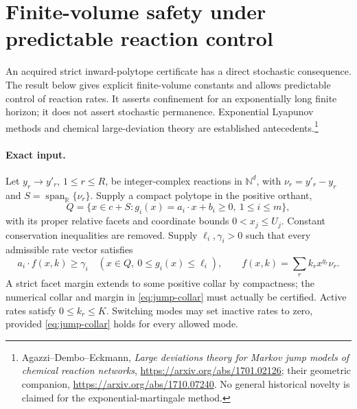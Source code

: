 \section{Finite-volume safety under predictable reaction control}
\label{app:jump-safety}

An acquired strict inward-polytope certificate has a direct stochastic
consequence. The result below gives explicit finite-volume constants and
allows predictable control of reaction rates. It asserts confinement for
an exponentially long finite horizon; it does not assert stochastic
permanence. Exponential Lyapunov methods and chemical large-deviation
theory are established antecedents.\footnote{Agazzi--Dembo--Eckmann,
\emph{Large deviations theory for Markov jump models of chemical reaction
networks}, \url{https://arxiv.org/abs/1701.02126}; their geometric companion,
\url{https://arxiv.org/abs/1710.07240}. No general historical novelty is
claimed for the exponential-martingale method.}

\paragraph{Exact input.}
Let $y_r\to y'_r$, $1\le r\le R$, be integer-complex reactions in
$\mathbb N^d$, with $\nu_r=y'_r-y_r$ and
$S=\operatorname{span}_{\mathbb R}\{\nu_r\}$. Supply a compact polytope
in the positive orthant,
\[
 Q=\{x\in c+S:g_i(x)=a_i\cdot x+b_i\ge0,
                         \ 1\le i\le m\},
\]
with its proper relative facets and coordinate bounds $0<x_j\le U_j$.
Constant conservation inequalities are removed. Supply
$\ell_i,\gamma_i>0$ such that every admissible rate vector satisfies
\begin{equation}
 a_i\cdot f(x,k)\ge\gamma_i\quad
 (x\in Q,\ 0\le g_i(x)\le\ell_i),\qquad
 f(x,k)=\sum_r k_r x^{y_r}\nu_r.
 \label{eq:jump-collar}
\end{equation}
A strict facet margin extends to some positive collar by compactness;
the numerical collar and margin in \eqref{eq:jump-collar} must actually
be certified. Active rates satisfy $0\le k_r\le K$. Switching modes
may set inactive rates to zero, provided \eqref{eq:jump-collar} holds
for every allowed mode.

